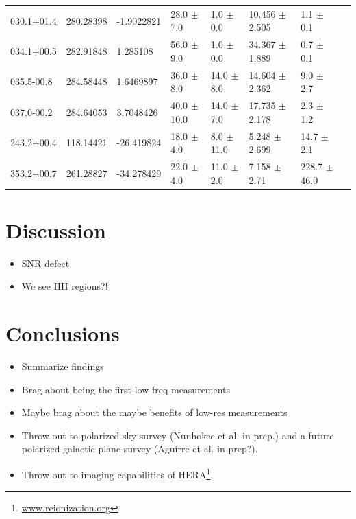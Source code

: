 \documentclass[useAMS,usenatbib]{mn2e}
\begin{document}
\begin{table}
\begin{tabular}{llllllll}
030.1+01.4  &  280.28398  &  -1.9022821  &  28.0 $\pm$ 7.0  & 1.0 $\pm$ 0.0  &  10.456 $\pm$ 2.505  &  1.1 $\pm$ 0.1 \\
034.1+00.5  &  282.91848  &  1.285108  &  56.0 $\pm$ 9.0  & 1.0 $\pm$ 0.0  &  34.367 $\pm$ 1.889  &  0.7 $\pm$ 0.1 \\
035.5-00.8  &  284.58448  &  1.6469897  &  36.0 $\pm$ 8.0  & 14.0 $\pm$ 8.0  &  14.604 $\pm$ 2.362  &  9.0 $\pm$ 2.7 \\
037.0-00.2  &  284.64053  &  3.7048426  &  40.0 $\pm$ 10.0  & 14.0 $\pm$ 7.0  &  17.735 $\pm$ 2.178  &  2.3 $\pm$ 1.2 \\
243.2+00.4  &  118.14421  &  -26.419824  &  18.0 $\pm$ 4.0  & 8.0 $\pm$ 11.0  &  5.248 $\pm$ 2.699  &  14.7 $\pm$ 2.1 \\
353.2+00.7  &  261.28827  &  -34.278429  &  22.0 $\pm$ 4.0  & 11.0 $\pm$ 2.0  &  7.158 $\pm$ 2.71  &  228.7 $\pm$ 46.0 \\
\hline
\end{tabular}
\label{tab:hii}
\end{table}




\section{Discussion}
\label{sec:disc}

\begin{itemize}
\item SNR defect
\item We see HII regions?!
\end{itemize}

\section{Conclusions}
\label{sec:conc}

\begin{itemize}
\item Summarize findings
\item Brag about being the first low-freq measurements
\item Maybe brag about the maybe benefits of low-res measurements
\item Throw-out to polarized sky survey (Nunhokee et al. in prep.) and a future polarized galactic plane survey (Aguirre et al. in prep?).
\item Throw out to imaging capabilities of HERA\footnote{\url{www.reionization.org}}.
\end{itemize}
\end{document}
